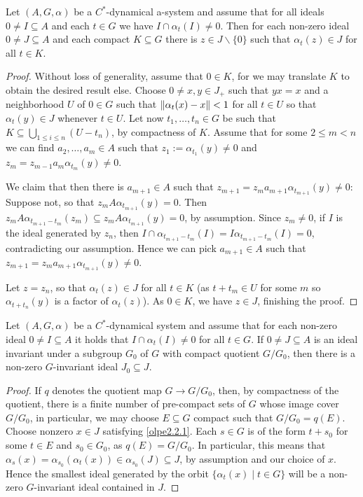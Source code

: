 \begin{lemma}
	Let $(A,G,\alpha)$ be a $C^*$-dynamical a-system and assume that for all ideals $0 \neq I \subseteq A$ and each $t \in G$ we have $I \cap \alpha_t(I) \neq 0$. Then for each non-zero ideal $0 \neq J \subseteq A$ and each compact $K \subseteq G$ there is $z \in J \backslash\{0\}$ such that $\alpha_t(z) \in J$ for all $t \in K$. 
	\label{olpe2.2.1}
\end{lemma}
\begin{proof}
	Without loss of generality, assume that $0 \in K$, for we may translate $K$ to obtain the desired result else.	Choose $0 \neq x,y \in J_+$ such that $yx=x$ and a neighborhood $U$ of $0 \in G$ such that $\left\lVert \alpha_t(x)-x\right\rVert < 1$ for all $t \in U$ so that $\alpha_t(y) \in J$ whenever $ t \in U$. Let now $t_1,\dots,t_n \in G$ be such that $K \subseteq \bigcup_{1 \leq i \leq n} (U-t_n)$, by compactness of $K$. Assume that for some $2 \leq m < n$ we can find $a_2,\dots,a_m \in A$ such that $z_1:= \alpha_{t_1}(y) \neq 0$ and $z_m = z_{m-1} a_m \alpha_{t_m}(y) \neq 0$.
	
	We claim that then there is $a_{m+1} \in A$ such that $z_{m+1}=z_{m}a_{m+1}\alpha_{t_{m+1}}(y) \neq 0$:	Suppose not, so that $z_m A \alpha_{t_{m+1}}(y) = 0$. Then $z_m A \alpha_{t_{m+1}-t_m}(z_m) \subseteq  z_m A \alpha_{t_{m+1}}(y)=0$, by assumption. Since $z_m \neq 0$, if $I$ is the ideal generated by $z_n$, then $I \cap \alpha_{t_{m+1}-t_m}(I) = I \alpha_{t_{m+1}-t_m}(I)= 0$, contradicting our assumption. Hence we can pick $a_{m+1} \in A$ such that $z_{m+1} = z_m a_{m+1} \alpha_{t_{m+1}}(y) \neq 0$. 
	
	Let $z = z_n$, so that $\alpha_t(z) \in J$ for all $t \in K$ (as $t + t_m \in U$ for some $m$ so $\alpha_{t+t_{n}}(y)$ is a factor of $\alpha_t(z)$). As $0 \in K$, we have $z \in J$, finishing the proof.
\end{proof}
\begin{proposition}
Let $(A,G,\alpha)$ be a $C^*$-dynamical system and assume that for each non-zero ideal $0 \neq I \subseteq A$ it holds that $I \cap \alpha_t(I) \neq 0 $ for all $t \in G$. If $0 \neq J \subseteq A$ is an ideal invariant under a subgroup $G_0$ of $G$ with compact quotient $G/G_0$, then there is a non-zero $G$-invariant ideal $J_0 \subseteq J$.
	\label{olpe2.2.2}
\end{proposition}
\begin{proof}
	If $q$ denotes the quotient map $G \to G/G_0$, then, by compactness of the quotient, there is a finite number of pre-compact sets of $G$ whose image cover $G/G_0$, in particular, we may choose $E \subseteq G$ compact such that $G/G_0 = q(E)$. Choose nonzero $x\in J$ satisfying \cref{olpe2.2.1}. Each $s \in G$ is of the form $t+s_0$ for some $t \in E$ and $s_0 \in G_0$, as $q(E) = G/G_0$. In particular, this means that $\alpha_s(x) = \alpha_{s_0}(\alpha_t(x)) \in \alpha_{s_0}(J) \subseteq J$, by assumption and our choice of $x$. Hence the smallest ideal generated by the orbit $\{ \alpha_t(x) \mid t \in G\}$ will be a non-zero $G$-invariant ideal contained in $J$.
\end{proof}
